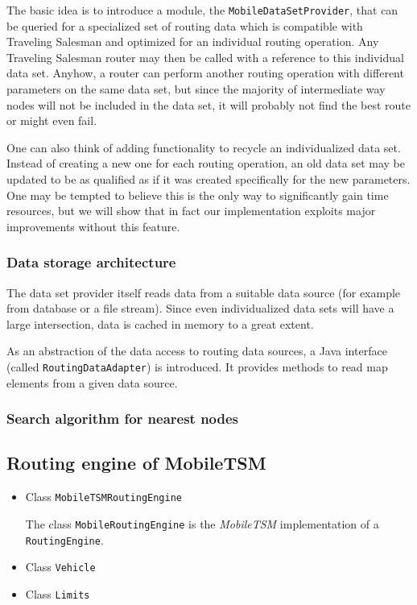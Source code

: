 The basic idea is to introduce a module, the \texttt{MobileDataSetProvider}, that can be queried for a specialized set of routing data which is compatible with Traveling Salesman and optimized for an individual routing operation. Any Traveling Salesman router may then be called with a reference to this individual data set. Anyhow, a router can perform another routing operation with different parameters on the same data set, but since the majority of intermediate way nodes will not be included in the data set, it will probably not find the best route or might even fail.\newline

One can also think of adding functionality to recycle an individualized data set. Instead of creating a new one for each routing operation, an old data set may be updated to be as qualified as if it was created specifically for the new parameters. One may be tempted to believe this is the only way to significantly gain time resources, but we will show that in fact our implementation exploits major improvements without this feature.

\subsubsection{Data storage architecture}

The data set provider itself reads data from a suitable data source (for example from database or a file stream). Since even individualized data sets will have a large intersection, data is cached in memory to a great extent.\newline

As an abstraction of the data access to routing data sources, a Java interface (called \texttt{RoutingDataAdapter}) is introduced. It provides methods to read map elements from a given data source.


\subsubsection{Search algorithm for nearest nodes}


\subsection{Routing engine of MobileTSM}

\begin{itemize}
		
	\item Class \texttt{MobileTSMRoutingEngine}
	
		The class \texttt{MobileRoutingEngine} is the \emph{MobileTSM} implementation of a \texttt{RoutingEngine}.
		
	\item Class \texttt{Vehicle}
		
	\item Class \texttt{Limits}

\end{itemize}
